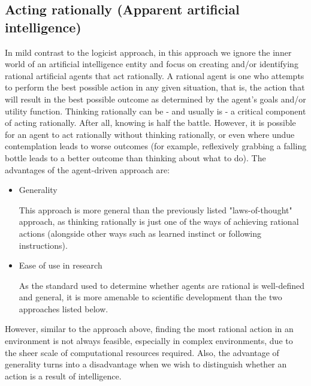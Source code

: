 \documentclass[masterthesis]{fer}
\begin{document}
\subsection{Acting rationally (Apparent artificial intelligence)}
In mild contrast to the logicist approach, in this approach we ignore the inner world of an artificial intelligence entity and focus on creating and/or identifying rational artificial agents that act rationally.
A rational agent is one who attempts to perform the best possible action in any given situation, that is, the action that will result in the best possible outcome as determined by the agent's goals and/or utility function.
Thinking rationally can be - and usually is - a critical component of acting rationally. After all, knowing is half the battle.
However, it is possible for an agent to act rationally without thinking rationally, or even where undue contemplation leads to worse outcomes (for example, reflexively grabbing a falling bottle leads to a better outcome than thinking about what to do).
The advantages of the agent-driven approach are:
\begin{itemize}
\item{Generality}

This approach is more general than the previously listed "laws-of-thought" approach, as thinking rationally is just one of the ways of achieving rational actions (alongside other ways such as learned instinct or following instructions).
\item{Ease of use in research}

As the standard used to determine whether agents are rational is well-defined and general, it is more amenable to scientific development than the two approaches listed below.
\end{itemize}
However, similar to the approach above, finding the most rational action in an environment is not always feasible, especially in complex environments, due to the sheer scale of computational resources required.
Also, the advantage of generality turns into a disadvantage when we wish to distinguish whether an action is a result of intelligence.
\end{document}
